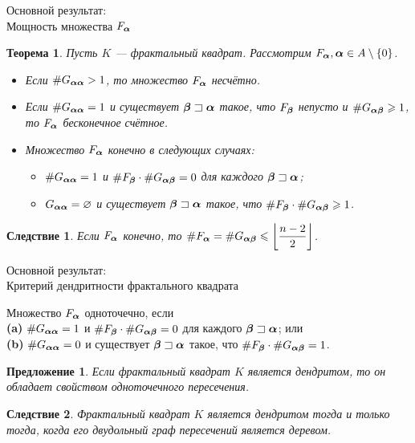 \documentclass[aspectratio=1610, 10pt, notheorems]{beamer}
\newtheorem{theorem}     {Теорема}
\newtheorem{proposition} {Предложение}
\newtheorem{corollary}   {Следствие}
\begin{document}
\begin{frame}{Основной результат:\\Мощность множества $F_{\bm{\alpha}}$}
\begin{theorem}\label{fin_int}
Пусть $K$ --- фрактальный квадрат. Рассмотрим $F_{\bm{\alpha}}, {\bm{\alpha}}\in A\setminus\{0\}$.
\begin{itemize}[nolistsep]
 \item[(i)] Если $\#G_{{\bm{\alpha}}{\bm{\alpha}}}> 1$, то множество $F_{\bm{\alpha}}$ несчётно.
 \item[(ii)] Если $\#G_{{\bm{\alpha}}{\bm{\alpha}}}=1$ и существует ${\bm{\beta}}\sqsupset{\bm{\alpha}}$ такое, что  $F_{\bm{\beta}}$ непусто и $\#G_{{\bm{\alpha}}{\bm{\beta}}}\geqslant1$, то $F_{\bm{\alpha}}$ бесконечное счётное.
 \item[(iii)] Множество $F_{\bm{\alpha}}$ конечно в следующих случаях:
 \begin{itemize}[nolistsep]
 \item[\textbf{(a)}] $\#G_{{\bm{\alpha}}{\bm{\alpha}}}=1$ и $\#F_{\bm{\beta}}\cdot\#G_{{\bm{\alpha}}{\bm{\beta}}}=0$ для каждого ${\bm{\beta}}\sqsupset{\bm{\alpha}}$;
 \item[\textbf{(b)}] $G_{{\bm{\alpha}}{\bm{\alpha}}}=\varnothing$ и существует ${\bm{\beta}}\sqsupset{\bm{\alpha}}$ такое, что $\#F_{\bm{\beta}}\cdot\#G_{{\bm{\alpha}}{\bm{\beta}}}\geqslant1$.
 \end{itemize}
\end{itemize} 
\end{theorem}
\begin{corollary}\label{onepoint} 
Если $F_{\bm{\alpha}}$ конечно, то  $\#F_{\bm{\alpha}}=\#G_{{\bm{\alpha}}{\bm{\beta}}}\leqslant\left\lfloor\dfrac{n-2}{2}\right\rfloor$.
\end{corollary}
\end{frame}





\begin{frame}{Основной результат:\\Критерий дендритности фрактального квадрата}

Множество $F_{\bm{\alpha}}$ одноточечно, если \\
\textbf{(a)} $\#G_{{\bm{\alpha}}{\bm{\alpha}}}=1$ и $\#F_{\bm{\beta}}\cdot\#G_{{\bm{\alpha}}{\bm{\beta}}}=0$ для каждого ${\bm{\beta}}\sqsupset{\bm{\alpha}}$; или\\
\textbf{(b)} $\#G_{{\bm{\alpha}}{\bm{\alpha}}}=0$ и существует ${\bm{\beta}}\sqsupset{\bm{\alpha}}$ такое, что $\#F_{\bm{\beta}}\cdot\#G_{{\bm{\alpha}}{\bm{\beta}}}=1$.

\begin{proposition}
\label{thm:den_necessary_sufficient}
Если фрактальный квадрат $K$ является дендритом, то он обладает свойством одноточечного пересечения.
\end{proposition}
\begin{corollary}\label{cor:fsden}
Фрактальный квадрат $K$ является дендритом тогда и только тогда, когда его двудольный граф пересечений является деревом.
\end{corollary}
\end{frame}
\end{document}

